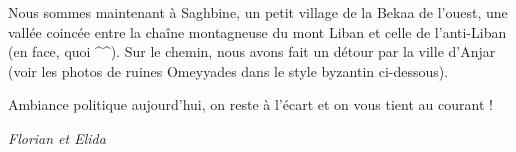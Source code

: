 Nous sommes maintenant à Saghbine, un petit village de la Bekaa de
l'ouest, une vallée coincée entre la chaîne montagneuse du mont Liban et
celle de l'anti-Liban (en face, quoi \^{}\^{}). Sur le chemin, nous
avons fait un détour par la ville d'Anjar (voir les photos de ruines
Omeyyades dans le style byzantin ci-dessous).

Ambiance politique aujourd'hui, on reste à l'écart et on vous tient au
courant !

\emph{Florian et Elida}

